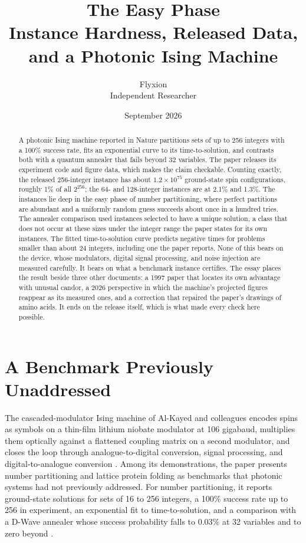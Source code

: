\documentclass[11pt]{article}
\title{The Easy Phase\\[4pt]
\large Instance Hardness, Released Data, and a Photonic Ising Machine}
\author{Flyxion\\ Independent Researcher}
\date{September 2026}
\theoremstyle{definition}
\theoremstyle{remark}
\begin{document}
\maketitle

\begin{abstract}
A photonic Ising machine reported in Nature partitions sets of up to 256 integers with a 100\% success rate, fits an exponential curve to its time-to-solution, and contrasts both with a quantum annealer that fails beyond 32 variables. The paper releases its experiment code and figure data, which makes the claim checkable. Counting exactly, the released 256-integer instance has about $1.2 \times 10^{75}$ ground-state spin configurations, roughly 1\% of all $2^{256}$; the 64- and 128-integer instances are at 2.1\% and 1.3\%. The instances lie deep in the easy phase of number partitioning, where perfect partitions are abundant and a uniformly random guess succeeds about once in a hundred tries. The annealer comparison used instances selected to have a unique solution, a class that does not occur at these sizes under the integer range the paper states for its own instances. The fitted time-to-solution curve predicts negative times for problems smaller than about 24 integers, including one the paper reports. None of this bears on the device, whose modulators, digital signal processing, and noise injection are measured carefully. It bears on what a benchmark instance certifies. The essay places the result beside three other documents: a 1997 paper that locates its own advantage with unusual candor, a 2026 perspective in which the machine's projected figures reappear as its measured ones, and a correction that repaired the paper's drawings of amino acids. It ends on the release itself, which is what made every check here possible.
\end{abstract}

\section{A Benchmark Previously Unaddressed}

The cascaded-modulator Ising machine of Al-Kayed and colleagues encodes spins as symbols on a thin-film lithium niobate modulator at 106 gigabaud, multiplies them optically against a flattened coupling matrix on a second modulator, and closes the loop through analogue-to-digital conversion, signal processing, and digital-to-analogue conversion \cite{alkayed2025}. Among its demonstrations, the paper presents number partitioning and lattice protein folding as benchmarks that photonic systems had not previously addressed. For number partitioning, it reports ground-state solutions for sets of 16 to 256 integers, a 100\% success rate up to 256 in experiment, an exponential fit to time-to-solution, and a comparison with a D-Wave annealer whose success probability falls to 0.03\% at 32 variables and to zero beyond \cite{alkayed2025}.
\end{document}
